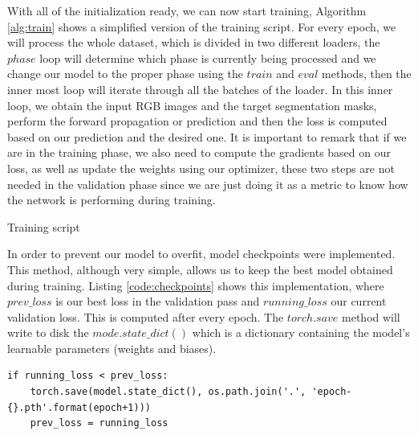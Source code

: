 With all of the initialization ready, we can now start training, Algorithm \ref{alg:train} shows a simplified version of the training script. For every epoch, we will process the whole dataset, which is divided in two different loaders, the $phase$ loop will determine which phase is currently being processed and we change our model to the proper phase using the $train$ and $eval$ methods, then the inner most loop will iterate through all the batches of the loader. In this inner loop, we obtain the input RGB images and the target segmentation masks, perform the forward propagation or prediction and then the loss is computed based on our prediction and the desired one. It is important to remark that if we are in the training phase, we also need to compute the gradients based on our loss, as well as update the weights using our optimizer, these two steps are not needed in the validation phase since we are just doing it as a metric to know how the network is performing during training.\newline

\begin{algorithm}[H]
	\DontPrintSemicolon
	\caption{Training script}
	\label{alg:train}
\end{algorithm}

In order to prevent our model to overfit, model checkpoints were implemented. This method, although very simple, allows us to keep the best model obtained during training. Listing \ref{code:checkpoints} shows this implementation, where $prev\_loss$ is our best loss in the validation pass and $running\_loss$ our current validation loss. This is computed after every epoch. The $torch.save$ method will write to disk the $mode.state\_dict()$ which is a dictionary containing the model's learnable parameters (weights and biases).


\begin{lstlisting}[style=Python-color, caption=Model checkpoints, frame=single, label=code:checkpoints]
if running_loss < prev_loss:
	torch.save(model.state_dict(), os.path.join('.', 'epoch-{}.pth'.format(epoch+1)))
	prev_loss = running_loss

\end{lstlisting}

